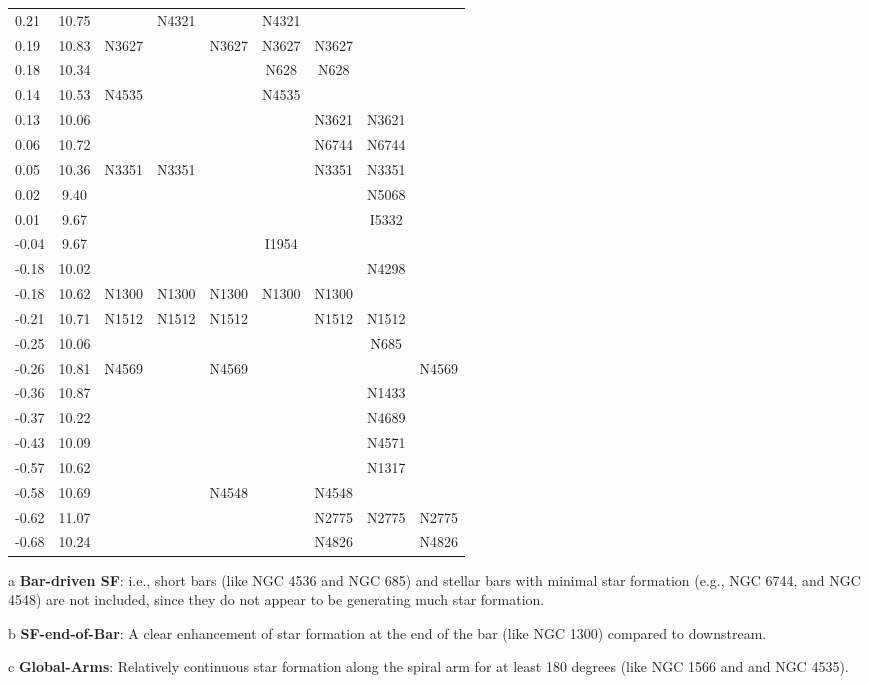 \begin{table*}
\begin{center}
\begin{threeparttable}
\begin{tabular}{lcccccccc}
0.21 & 10.75 &  & N4321 &  & N4321 &  &  & \\
0.19 & 10.83 & N3627 &  & N3627 & N3627 & N3627 &  & \\
0.18 & 10.34 &  &  &  & N628 & N628 &  & \\
0.14 & 10.53 & N4535 &  &  & N4535 &  &  & \\
0.13 & 10.06 &  &  &  &  & N3621 & N3621 & \\
0.06 & 10.72 &  &  &  &  & N6744 & N6744 & \\
0.05 & 10.36 & N3351 & N3351 &  &  & N3351 & N3351 & \\
0.02 & 9.40 &  &  &  &  &  & N5068 & \\
0.01 & 9.67 &  &  &  &  &  & I5332 & \\
-0.04 & 9.67 &  &  &  & I1954 &  &  & \\
-0.18 & 10.02 &  &  &  &  &  & N4298 & \\
-0.18 & 10.62 & N1300 & N1300 & N1300 & N1300 & N1300 &  & \\
-0.21 & 10.71 & N1512 & N1512 & N1512 &  & N1512 & N1512 & \\
-0.25 & 10.06 &  &  &  &  &  & N685 & \\
-0.26 & 10.81 & N4569 &  & N4569 &  &  &  & N4569\\
-0.36 & 10.87 &  &  &  &  &  & N1433 & \\
-0.37 & 10.22 &  &  &  &  &  & N4689 & \\
-0.43 & 10.09 &  &  &  &  &  & N4571 & \\
-0.57 & 10.62 &  &  &  &  &  & N1317 & \\
-0.58 & 10.69 &  &  & N4548 &  & N4548 &  & \\
-0.62 & 11.07 &  &  &  &  & N2775 & N2775 & N2775\\
-0.68 & 10.24 &  &  &  &  & N4826 &  & N4826\\
\hline
\end{tabular} 
\begin{tablenotes}
\item[a] \textbf{Bar-driven SF}: i.e., short bars (like NGC 4536 and NGC 685) and stellar bars 
with minimal star formation
(e.g., NGC 6744, and NGC 4548) are not included, since they do not appear  to be generating much star formation. 
\item[b] \textbf{SF-end-of-Bar}: A clear enhancement of star formation at the end of the bar (like NGC 1300) compared to downstream.
\item[c] \textbf{Global-Arms}: Relatively continuous  star formation along the spiral arm for at least 180 degrees (like NGC 1566 and and NGC 4535).

\end{tablenotes}
\end{threeparttable}
\end{center}
\end{table*}
